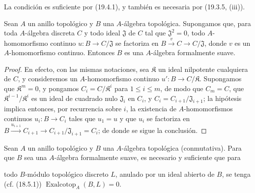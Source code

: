 La condición es suficiente por (19.4.1), y también es necesaria por
(19.3.5, (iii)).

\begin{proposition}[19.4.3]
\label{0.19.4.3-fr}
Sean $A$ un anillo topológico y $B$ una $A$-álgebra topológica. Supongamos
que, para toda $A$-álgebra discreta $C$ y todo ideal $\mathfrak J$ de $C$
tal que $\mathfrak J^2=0$, todo $A$-homomorfismo continuo
$u:B\to C/\mathfrak J$ se factoriza en
$B\xrightarrow{v}C\to C/\mathfrak J$, donde $v$ es un $A$-homomorfismo
continuo. Entonces $B$ es una $A$-álgebra formalmente suave.
\end{proposition}

\begin{proof}
En efecto, con las mismas notaciones, sea $\mathfrak K$ un ideal nilpotente
cualquiera de $C$, y consideremos un $A$-homomorfismo continuo
$u':B\to C/\mathfrak K$. Supongamos que $\mathfrak K^m=0$, y pongamos
$C_i=C/\mathfrak K^i$ para $1\leq i\leq m$, de modo que $C_m=C$, que
$\mathfrak K^{i-1}/\mathfrak K^i$ es un ideal de cuadrado nulo
$\mathfrak J_i$ en $C_i$, y $C_i=C_{i+1}/\mathfrak J_{i+1}$;
la hipótesis implica entonces, por recurrencia sobre $i$, la existencia de
$A$-homomorfismos continuos $u_i:B\to C_i$ tales que $u_1=u$ y que $u_i$
se factoriza en
$B\xrightarrow{u_{i+1}}C_{i+1}\to C_{i+1}/\mathfrak J_{i+1}=C_i$;
de donde se sigue la conclusión.
\end{proof}

\begin{proposition}[19.4.4]
\label{0.19.4.4-fr}
Sean $A$ un anillo topológico y $B$ una $A$-álgebra topológica
(conmutativa). Para que $B$ sea una $A$-álgebra formalmente suave, es necesario y
suficiente que para


todo $B$-módulo topológico discreto $L$, anulado por un ideal abierto de $B$, se
tenga \textup{(cf. (18.5.1))}
$\operatorname{Exalcotop}_A(B,L)=0$.
\end{proposition}

